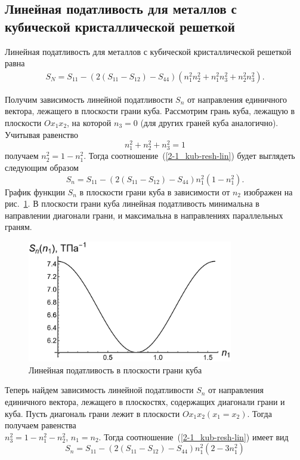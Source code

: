 \documentclass[12pt, a4paper]{article}
\begin{document}
\subsection{Линейная податливость для металлов с кубической кристаллической решеткой}

Линейная податливость для металлов с кубической кристаллической решеткой
равна 
\begin{gather} 
	\label{2-1_kub-resh-lin}
	S_N = S_{11} - \left( 2 \left(S_{11} - S_{12}\right) - S_{44} \right) (n_1^2 n_2^2 + n_1^2 n_3^2 + n_2^2 n_3^2).
\end{gather}

Получим зависимость линейной податливости $S_n$ от направления единичного вектора, лежащего в плоскости грани куба. Рассмотрим грань куба, лежащую в плоскости $O x_1 x_2$, на которой $n_3 = 0$ (для других граней куба аналогично). Учитывая равенство
\[
n_1^2 + n_2^2 + n_3^2 = 1
\]
получаем $n_2^2 = 1 - n_1^2$. Тогда соотношение~(\ref{2-1_kub-resh-lin}) будет выглядеть следующим образом
\[
S_n = S_{11} - \left( 2 \left(S_{11} - S_{12}\right) - S_{44} \right) n_1^2 \left(1 - n_1^2\right).
\]
График функции $S_n$ в плоскости грани куба в зависимости от $n_2$ изображен
на рис.~\ref{lin-pod-kube}. В плоскости грани куба линейная податливость минимальна в направлении диагонали грани, и
максимальна в направлениях параллельных граням.
\begin{figure}[!htbp]
	\centering
	\includegraphics[width=0.8\textwidth]{pic-1}%
	\caption{Линейная податливость в плоскости грани куба}
	\vspace*{-2mm}
	\label{lin-pod-kube}
\end{figure}

Теперь найдем зависимость линейной податливости $S_n$ от направления единичного вектора, лежащего в плоскостях, содержащих диагонали грани и куба. Пусть
диагональ грани лежит в плоскости $Ox_1x_2 \left(x_1 = x_2 \right)$.
Тогда получаем равенства\\
$n_{3}^{2} = 1 - n_{1}^{2} - n^2_2$,
$n_1 = n_2$. Тогда соотношение~(\ref{2-1_kub-resh-lin}) имеет вид
\[
S_n = S_{11} - \left( 2 \left(S_{11} - S_{12}\right) - S_{44} \right) n_1^2 \left(2 - 3 n_1^2\right)
\]
\end{document}
